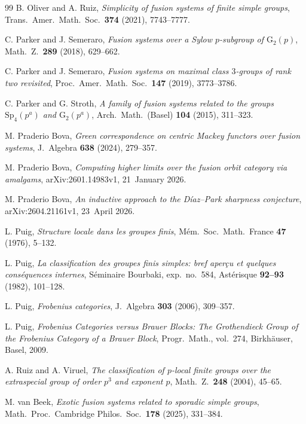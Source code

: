 \documentclass[10pt]{amsart}
\theoremstyle{definition}
\numberwithin{equation}{section}
\begin{document}
\begin{thebibliography}{99}
B. Oliver and A. Ruiz,
{\it Simplicity of fusion systems of finite simple groups},
Trans.\ Amer.\ Math.\ Soc.\ \textbf{374} (2021), 7743--7777.

C. Parker and J. Semeraro,
{\it Fusion systems over a Sylow $p$-subgroup of $\mathrm{G}_2(p)$},
Math.\ Z.\ \textbf{289} (2018), 629--662.

C. Parker and J. Semeraro,
{\it Fusion systems on maximal class $3$-groups of rank two revisited},
Proc.\ Amer.\ Math.\ Soc.\ \textbf{147} (2019), 3773--3786.

C. Parker and G. Stroth,
{\it A family of fusion systems related to the groups $\mathrm{Sp}_4(p^a)$ and $\mathrm{G}_2(p^a)$},
Arch.\ Math.\ (Basel) \textbf{104} (2015), 311--323.

M. Praderio Bova,
{\it Green correspondence on centric Mackey functors over fusion systems},
J.\ Algebra \textbf{638} (2024), 279--357.

M. Praderio Bova,
{\it Computing higher limits over the fusion orbit category via amalgams},
arXiv:2601.14983v1, 21~January 2026.

M. Praderio Bova,
{\it An inductive approach to the D\'iaz--Park sharpness conjecture},
arXiv:2604.21161v1, 23~April 2026.

L. Puig,
{\it Structure locale dans les groupes finis},
M\'em.\ Soc.\ Math.\ France \textbf{47} (1976), 5--132.

L. Puig,
{\it La classification des groupes finis simples: bref aper\c{c}u et quelques cons\'equences internes},
S\'eminaire Bourbaki, exp.~no.~584,
Ast\'erisque \textbf{92--93} (1982), 101--128.

L. Puig,
{\it Frobenius categories},
J.\ Algebra \textbf{303} (2006), 309--357.

L. Puig,
{\it Frobenius Categories versus Brauer Blocks: The Grothendieck Group of the Frobenius Category of a Brauer Block},
Progr.\ Math., vol.~274,
Birkh\"auser, Basel, 2009.

A. Ruiz and A. Viruel,
{\it The classification of $p$-local finite groups over the extraspecial group of order $p^3$ and exponent $p$},
Math.\ Z.\ \textbf{248} (2004), 45--65.

M. van Beek,
{\it Exotic fusion systems related to sporadic simple groups},
Math.\ Proc.\ Cambridge Philos.\ Soc.\ \textbf{178} (2025), 331--384.


\end{thebibliography}
\end{document}
